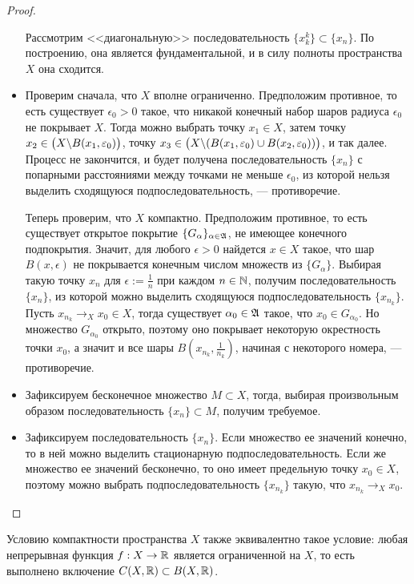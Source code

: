 \begin{proof}
\begin{itemize}
        Рассмотрим <<диагональную>> последовательность $\{x_k^k\} \subset \{x_n\}$. По построению, она является фундаментальной, и в силу полноты пространства $X$ она сходится.
        
        \item{}Проверим сначала, что $X$ вполне ограниченно. Предположим противное, то есть существует $\epsilon_0 > 0$ такое, что никакой конечный набор шаров радиуса $\epsilon_0$ не покрывает $X$. Тогда можно выбрать точку $x_1 \in X$, затем точку $x_2 \in \big(X \backslash B(x_1, \varepsilon_0)\big)$, точку $x_3 \in \big(X \backslash (B(x_1, \varepsilon_0) \cup B(x_2, \varepsilon_0))\big)$, и так далее. Процесс не закончится, и будет получена последовательность $\{x_n\}$ с попарными расстояниями между точками не меньше $\epsilon_0$, из которой нельзя выделить сходящуюся подпоследовательность, --- противоречие.
        
        Теперь проверим, что $X$ компактно. Предположим противное, то есть существует открытое покрытие $\{G_\alpha\}_{\alpha \in \mathfrak A}$, не имеющее конечного подпокрытия. Значит, для любого $\epsilon > 0$ найдется $x \in X$ такое, что шар $B(x, \epsilon)$ не покрывается конечным числом множеств из $\{G_\alpha\}$. Выбирая такую точку $x_n$ для $\epsilon := \frac 1n$ при каждом $n \in \mathbb{N}$, получим последовательность $\{x_n\}$, из которой можно выделить сходящуюся подпоследовательность $\{x_{n_k}\}$. Пусть $x_{n_k} \to_X x_0 \in X$, тогда существует $\alpha_0 \in \mathfrak A$ такое, что $x_0 \in G_{\alpha_0}$. Но множество $G_{\alpha_0}$ открыто, поэтому оно покрывает некоторую окрестность точки $x_0$, а значит и все шары $B(x_{n_k}, \frac1{n_k})$, начиная с некоторого номера, --- противоречие.
        
        \item{}Зафиксируем бесконечное множество $M \subset X$, тогда, выбирая произвольным образом последовательность $\{x_n\} \subset M$, получим требуемое.
        
        \item{}Зафиксируем последовательность $\{x_n\}$. Если множество ее значений конечно, то в ней можно выделить стационарную подпоследовательность. Если же множество ее значений бесконечно, то оно имеет предельную точку $x_0 \in X$, поэтому можно выбрать подпоследовательность $\{x_{n_k}\}$ такую, что $x_{n_k} \to_X x_0$.\qedhere
    \end{itemize}
\end{proof}

\begin{note}
    Условию компактности пространства $X$ также эквивалентно такое условие: любая непрерывная функция $f : X \to \mathbb{R}$ является ограниченной на $X$, то есть выполнено включение $C(X, \mathbb{R}) \subset B(X, \mathbb{R})$.
\end{note}

